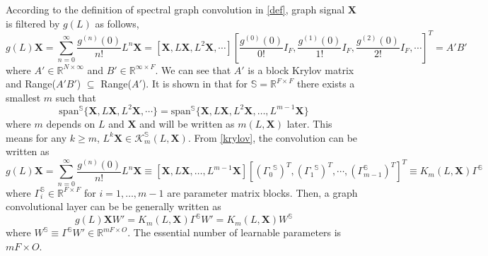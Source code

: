 \documentclass{article}
\newcommand{\colvec}[2][1]{%
	\scalebox{#1}{%
		\renewcommand{\arraystretch}{1.45}%
		$\begin{bmatrix}#2\end{bmatrix}$%
	}
}
\begin{document}
According to the definition of spectral graph convolution in \eqref{def}, graph signal $\bm{X}$ is filtered by $g(L)$ as follows,
$$ g(L) \bm{X} = \sum\limits_{n=0}^\infty \frac{g^{(n) } (0)}{n!} L^n \bm{X} =\left[\bm{X}, L\bm{X}, L^2\bm{X}, \cdots  \right] \left[\frac{g^{(0) } (0)}{0!} {I_{F}} , \frac{g^{(1) } (0)}{1!}{I_{F}}  ,\frac{g^{(2) } (0)}{2!}{I_{F}}  , \cdots \right]^T = A'B'$$
where $A' \in \mathbb{R}^{N \times \infty}$ and $B' \in \mathbb{R}^{\infty \times F}$.
We can see that $A'$ is a block Krylov matrix and Range($A'B'$) $\subseteq$ Range($A'$).
It is shown in \cite{gutknecht2009block,frommer2017block}  that for $\mathbb{S}=\mathbb{R}^{F\times F}$
there exists a smallest $m$ such that
\begin{equation} \label{krylov}
\text{span}^{\mathbb{S}} \{\bm{X}, L\bm{X}, L^2\bm{X}, \cdots  \}
= \text{span}^{\mathbb{S}} \{\bm{X}, L\bm{X}, L^2\bm{X}, \dots,L^{m-1}\bm{X} \}
\end{equation}
where $m$ depends on $L$ and $\bm{X}$ and will be written as $m(L,\bm{X})$ later.
This means for any $k\geq m$, $L^k \bm{X} \in \mathcal{K}_m^{\mathbb{S}} (L,\bm{X})$.
From \eqref{krylov}, the convolution can be written as
\begin{equation}\label{eq5}
g(L) \bm{X}
= \sum\limits_{n=0}^\infty \frac{g^{(n) } (0)}{n!} L^n \bm{X}
\equiv \left[\bm{X}, L\bm{X}, \dots,L^{m-1}\bm{X}  \right] \left[ ({\Gamma_0}^{\mathbb{S}})^T  , ({\Gamma_1}^{\mathbb{S}})^T, \cdots ,({\Gamma_{m-1}^{\mathbb{S}}})^T  \right]^T \equiv  K_m (L,\bm{X}) \Gamma^{\mathbb{S}}
\end{equation}
where ${\Gamma_{i}^{\mathbb{S}}}\in \mathbb{R}^{F\times F}$ for $i=1,\ldots, m-1$ are parameter matrix blocks.
Then, a graph convolutional layer can be be generally written as %
\begin{equation} \label{eq6}
g(L)\bm{X}W' =  K_m (L,\bm{X}) \Gamma^{\mathbb{S}} W' =  K_m (L,\bm{X}) W^{\mathbb{S}}
\end{equation}
where $W^{\mathbb{S}} \equiv \Gamma^{\mathbb{S}} W' \in \mathbb{R}^{mF \times O}$. The essential  number of learnable parameters is $mF\times O$. %
\end{document}
